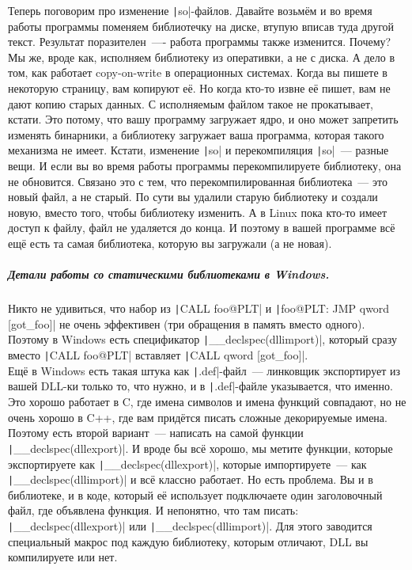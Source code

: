\documentclass{article}
\begin{document}
    Теперь поговорим про изменение \texttt|so|-файлов. Давайте возьмём и во время работы программы поменяем библиотечку на диске, втупую вписав туда другой текст. Результат поразителен~---- работа программы также изменится. Почему? Мы же, вроде как, исполняем библиотеку из оперативки, а не с диска. А дело в том, как работает copy-on-write в операционных системах. Когда вы пишете в некоторую страницу, вам копируют её. Но когда кто-то извне её пишет, вам не дают копию старых данных. С исполняемым файлом такое не прокатывает, кстати. Это потому, что вашу программу загружает ядро, и оно может запретить изменять бинарники, а библиотеку загружает ваша программа, которая такого механизма не имеет. Кстати, изменение \texttt|so| и перекомпиляция \texttt|so|~--- разные вещи. И если вы во время работы программы перекомпилируете библиотеку, она не обновится. Связано это с тем, что перекомпилированная библиотека~--- это новый файл, а не старый. По сути вы удалили старую библиотеку и создали новую, вместо того, чтобы библиотеку изменить. А в Linux пока кто-то имеет доступ к файлу, файл не удаляется до конца. И поэтому в вашей программе всё ещё есть та самая библиотека, которую вы загружали (а не новая).
    \subparagraph{Детали работы со статическими библиотеками в Windows.}
    Никто не удивиться, что набор из \texttt|CALL foo@PLT| и \texttt|foo@PLT: JMP qword [got_foo]| не очень эффективен (три обращения в память вместо одного). Поэтому в Windows есть спецификатор \texttt|__declspec(dllimport)|, который сразу вместо \texttt|CALL foo@PLT| вставляет \texttt|CALL qword [got_foo]|.\\
    Ещё в Windows есть такая штука как \texttt|.def|-файл~--- линковщик экспортирует из вашей DLL-ки только то, что нужно, и в \texttt|.def|-файле указывается, что именно. Это хорошо работает в C, где имена символов и имена функций совпадают, но не очень хорошо в C++, где вам придётся писать сложные декорируемые имена. Поэтому есть второй вариант~--- написать на самой функции \texttt|__declspec(dllexport)|. И вроде бы всё хорошо, мы метите функции, которые экспортируете как \texttt|__declspec(dllexport)|, которые импортируете~--- как \texttt|__declspec(dllimport)| и всё классно работает. Но есть проблема. Вы и в библиотеке, и в коде, который её использует подключаете один заголовочный файл, где объявлена функция. И непонятно, что там писать: \texttt|__declspec(dllexport)| или \texttt|__declspec(dllimport)|. Для этого заводится специальный макрос под каждую библиотеку, которым отличают, DLL вы компилируете или нет.\\
\end{document}
